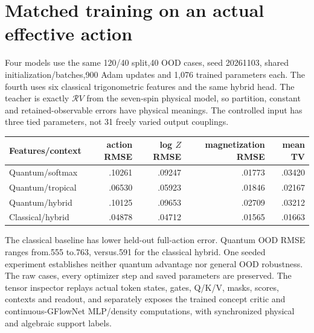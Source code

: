 \documentclass[11pt,oneside,openany]{book}
\theoremstyle{definition}\newtheorem{definition}[theorem]{Definition}
\theoremstyle{remark}\newtheorem{remark}[theorem]{Remark}
\begin{document}
\section{Matched training on an actual effective action}
Four models use the same 120/40 split,40 OOD cases, seed 20261103, shared
initialization/batches,900 Adam updates and 1,076 trained parameters each.
The fourth uses six classical trigonometric features and the same hybrid
head. The teacher is exactly $\mathcal RV $ from the seven-spin physical
model, so partition, constant and retained-observable errors have physical
meanings. The controlled input has three tied parameters, not 31 freely
varied output couplings.
\begin{center}\small
\begin{tabular}{lrrrr}
Features/context&action RMSE&log $ Z $ RMSE&magnetization RMSE&mean TV\\\hline
Quantum/softmax&.10261&.09247&.01773&.03420\\
Quantum/tropical&.06530&.05923&.01846&.02167\\
Quantum/hybrid&.10125&.09653&.02709&.03212\\
Classical/hybrid&.04878&.04712&.01565&.01663
\end{tabular}
\end{center}
The classical baseline has lower held-out full-action error. Quantum OOD
RMSE ranges from.555 to.763, versus.591 for the classical hybrid. One seeded
experiment establishes neither quantum advantage nor general OOD robustness.
The raw cases, every optimizer step and saved parameters are preserved.
The tensor inspector replays actual token states, gates, Q/K/V, masks, scores,
contexts and readout, and separately exposes the trained concept critic and
continuous-GFlowNet MLP/density computations, with synchronized physical and algebraic support labels.
\end{document}
